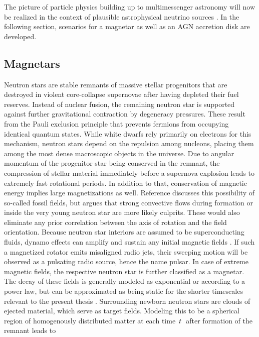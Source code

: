 The picture of particle physics building up to multimessenger astronomy will now be realized in the context of plausible astrophysical
neutrino sources \cite{Becker_2008}. In the following section, scenarios for a magnetar as well as an AGN accretion disk are developed.



\subsection{Magnetars}
\label{sub:magnetars}

Neutron stars are stable remnants of massive stellar progenitors that are destroyed in violent core-collapse supernovae after having
depleted their fuel reserves. Instead of nuclear fusion, the remaining neutron star is supported against further gravitational
contraction by degeneracy pressures. These result from the Pauli exclusion principle that prevents fermions from occupying identical
quantum states. While white dwarfs rely primarily on electrons for this mechanism, neutron stars depend on the repulsion among
nucleons, placing them among the most dense macroscopic objects in the universe. Due to angular momentum of the progenitor
star being conserved in the remnant, the compression of stellar material immediately before a supernova explosion leads to
extremely fast rotational periods. In addition to that, conservation of magnetic energy implies large magnetizations as well.
Reference \cite{Thompson_1993} discusses this possibility of so-called fossil fields, but argues that strong convective flows
during formation or inside the very young neutron star are more likely culprits. These would also eliminate any prior correlation
between the axis of rotation and the field orientation. Because neutron star interiors are assumed to be superconducting fluids,
dynamo effects can amplify and sustain any initial magnetic fields \cite{Haskell_2018}. If such a magnetized rotator emits misaligned
radio jets, their sweeping motion will be observed as a pulsating radio source, hence the name pulsar. In case of extreme magnetic
fields, the respective neutron star is further classified as a magnetar. The decay of these fields is generally modeled
as exponential or according to a power law, but can be approximated as being static for the shorter timescales relevant to the present
thesis \cite{Sang_1990}. Surrounding newborn neutron stars are clouds of ejected material, which serve as target fields. Modeling this
to be a spherical region of homogenously distributed matter at each time~$t \kern+0.5pt$~after formation of the remnant leads to
